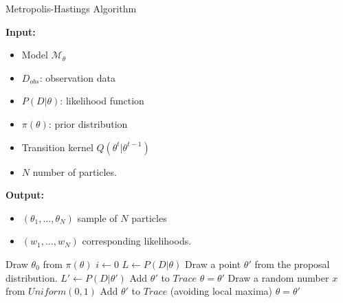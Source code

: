\begin{algorithm}[H]
      \caption{Metropolis-Hastings Algorithm}
      \label{alg:mh}
      \footnotesize{
            \hspace*{\algorithmicindent} \textbf{Input:}
            \begin{itemize}
                  \item Model $\mathcal{M}_\theta$
                  \item $D_{obs}$: observation data
                  \item $P(D|\theta)$: likelihood function
                  \item $\pi(\theta)$: prior distribution
                  \item Transition kernel $Q(\theta^t|\theta^{t-1})$
                  \item $N$ number of particles.
            \end{itemize}
            \hspace*{\algorithmicindent} \textbf{Output:}
            \begin{itemize}
                  \item $(\theta_1,\ldots,\theta_N)$ sample of $N$ particles
                  \item $(w_1,\ldots,w_N)$ corresponding likelihoods.
            \end{itemize}
      }
      \begin{algorithmic}[1]
            \State Draw $\theta_0$ from $\pi(\theta)$
            \State $i \leftarrow 0$
            \State $L \leftarrow P(D|\theta)$
            \State Draw a point $\theta' $ from the proposal distribution.
            \State $L' \leftarrow P(D|\theta')$
            \State Add $\theta'$ to $Trace$
            \State $\theta = \theta'$
            \Else
            \State Draw a random number $x$ from $Uniform(0,1)$
            \State Add $\theta'$ to $Trace$ (avoiding local maxima)
            \State $\theta = \theta'$
            \EndIf
            \EndIf
            \EndWhile
            \EndProcedure
      \end{algorithmic}
\end{algorithm}


